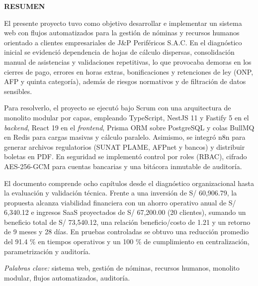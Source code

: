 \clearpage
{}
{}

\begin{center}
    {\bfseries\large RESUMEN}
\end{center}
\vspace{0.1cm}

\noindent El presente proyecto tuvo como objetivo desarrollar e implementar un sistema web con flujos automatizados 
para la gestión de nóminas y recursos humanos orientado a clientes empresariales de J\&P Periféricos S.A.C. 
En el diagnóstico inicial se evidenció dependencia de hojas de cálculo dispersas, consolidación manual de asistencias 
y validaciones repetitivas, lo que provocaba demoras en los cierres de pago, errores en horas extras, bonificaciones 
y retenciones de ley (ONP, AFP y quinta categoría), además de riesgos normativos y de filtración de datos sensibles.

Para resolverlo, el proyecto se ejecutó bajo Scrum con una arquitectura de monolito modular por capas, empleando 
TypeScript, NestJS 11 y Fastify 5 en el \textit{backend}, React 19 en el \textit{frontend}, Prisma ORM sobre PostgreSQL 
y colas BullMQ en Redis para cargas masivas y cálculo paralelo. Asimismo, se integró n8n para generar archivos 
regulatorios (SUNAT PLAME, AFPnet y bancos) y distribuir boletas en PDF. En seguridad se implementó control por roles 
(RBAC), cifrado AES-256-GCM para cuentas bancarias y una bitácora inmutable de auditoría.

El documento comprende ocho capítulos desde el diagnóstico organizacional hasta la evaluación y validación técnica. 
Frente a una inversión de S/ 60,906.79, la propuesta alcanza viabilidad financiera con un ahorro operativo anual de 
S/ 6,340.12 e ingresos SaaS proyectados de S/ 67,200.00 (20 clientes), sumando un beneficio total de S/ 73,540.12, 
una relación beneficio/costo de 1.21 y un retorno de 9 meses y 28 días. En pruebas controladas se obtuvo una reducción 
promedio del 91.4 \% en tiempos operativos y un 100 \% de cumplimiento en centralización, parametrización y auditoría.

\textit{Palabras clave:} sistema web, gestión de nóminas, recursos humanos, monolito modular, flujos automatizados, auditoría.